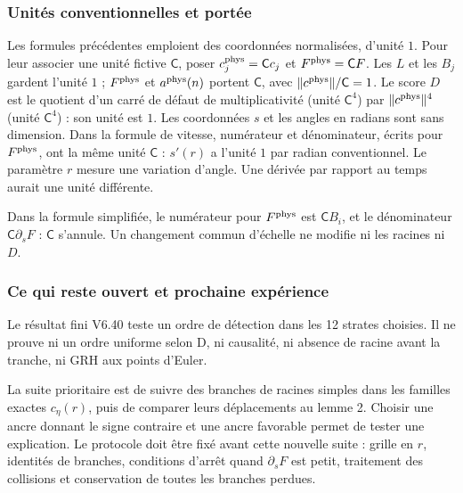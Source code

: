 \documentclass[
  10pt,
  a4paper,
]{article}
\begin{document}
\hypertarget{unituxe9s-conventionnelles-et-portuxe9e}{%
\subsubsection{Unités conventionnelles et
portée}\label{unituxe9s-conventionnelles-et-portuxe9e}}

Les formules précédentes emploient des coordonnées normalisées, d'unité
\(1\). Pour leur associer une unité fictive \(\mathsf C\), poser
\(c_j^{\rm phys}=\mathsf Cc_j\) et \(F^{\rm phys}=\mathsf CF\). Les
\(L\) et les \(B_j\) gardent l'unité \(1\) ; \(F^{\rm phys}\) et
\(a^{\rm phys}(n)\) portent \(\mathsf C\), avec
\(\|c^{\rm phys}\|/\mathsf C=1\). Le score \(D\) est le quotient d'un
carré de défaut de multiplicativité (unité \(\mathsf C^4\)) par
\(\|c^{\rm phys}\|^4\) (unité \(\mathsf C^4\)) : son unité est \(1\).
Les coordonnées \(s\) et les angles en radians sont sans dimension. Dans
la formule de vitesse, numérateur et dénominateur, écrits pour
\(F^{\rm phys}\), ont la même unité \(\mathsf C\) : \(s'(r)\) a l'unité
\(1\) par radian conventionnel. Le paramètre \(r\) mesure une variation
d'angle. Une dérivée par rapport au temps aurait une unité différente.

Dans la formule simplifiée, le numérateur pour \(F^{\rm phys}\) est
\(\mathsf CB_i\), et le dénominateur \(\mathsf C\partial_sF\) :
\(\mathsf C\) s'annule. Un changement commun d'échelle ne modifie ni les
racines ni \(D\).

\hypertarget{ce-qui-reste-ouvert-et-prochaine-expuxe9rience}{%
\subsubsection{Ce qui reste ouvert et prochaine
expérience}\label{ce-qui-reste-ouvert-et-prochaine-expuxe9rience}}

Le résultat fini V6.40 teste un ordre de détection dans les 12 strates
choisies. Il ne prouve ni un ordre uniforme selon D, ni causalité, ni
absence de racine avant la tranche, ni GRH aux points d'Euler.

La suite prioritaire est de suivre des branches de racines simples dans
les familles exactes \(c_\eta(r)\), puis de comparer leurs déplacements
au lemme 2. Choisir une ancre donnant le signe contraire et une ancre
favorable permet de tester une explication. Le protocole doit être fixé
avant cette nouvelle suite : grille en \(r\), identités de branches,
conditions d'arrêt quand \(\partial_sF\) est petit, traitement des
collisions et conservation de toutes les branches perdues.
\end{document}
